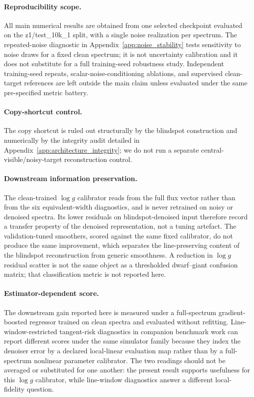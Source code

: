 \documentclass[twocolumn]{aastex7}
\begin{document}
\paragraph{Reproducibility scope.} All main numerical results are obtained from one selected checkpoint evaluated on the z1/test\_10k\_1 split, with a single noise realization per spectrum. The repeated-noise diagnostic in Appendix~\ref{app:noise_stability} tests sensitivity to noise draws for a fixed clean spectrum; it is not uncertainty calibration and it does not substitute for a full training-seed robustness study. Independent training-seed repeats, scalar-noise-conditioning ablations, and supervised clean-target references are left outside the main claim unless evaluated under the same pre-specified metric battery.

\paragraph{Copy-shortcut control.} The copy shortcut is ruled out structurally by the blindspot construction and numerically by the integrity audit detailed in Appendix~\ref{app:architecture_integrity}; we do not run a separate central-visible/noisy-target reconstruction control.

\paragraph{Downstream information preservation.} The clean-trained $\log g$ calibrator reads from the full flux vector rather than from the six equivalent-width diagnostics, and is never retrained on noisy or denoised spectra. Its lower residuals on blindspot-denoised input therefore record a transfer property of the denoised representation, not a tuning artefact. The validation-tuned smoothers, scored against the same fixed calibrator, do not produce the same improvement, which separates the line-preserving content of the blindspot reconstruction from generic smoothness. A reduction in $\log g$ residual scatter is not the same object as a thresholded dwarf--giant confusion matrix; that classification metric is not reported here.

\paragraph{Estimator-dependent score.} The downstream gain reported here is measured under a full-spectrum gradient-boosted regressor trained on clean spectra and evaluated without refitting. Line-window-restricted tangent-risk diagnostics in companion benchmark work can report different scores under the same simulator family because they index the denoiser error by a declared local-linear evaluation map rather than by a full-spectrum nonlinear parameter calibrator. The two readings should not be averaged or substituted for one another: the present result supports usefulness for this $\log g$ calibrator, while line-window diagnostics answer a different local-fidelity question.
\end{document}
